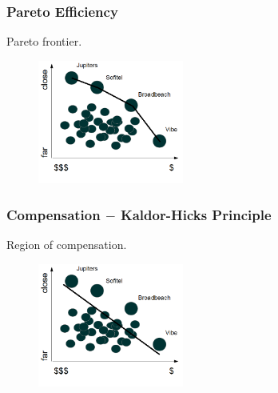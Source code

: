 \documentclass[14pt]{beamer}
\begin{document}
\begin{frame}\frametitle{Pareto Efficiency}

Pareto frontier.

\begin{figure}
\centering
\includegraphics[height=1.60in]{hotel2}
\end{figure}

\end{frame}

\begin{frame}\frametitle{Compensation $-$ Kaldor-Hicks Principle}

Region of compensation.

\begin{figure}
\centering
\includegraphics[height=1.60in]{hotel3}
\end{figure}

\end{frame}
\end{document}
